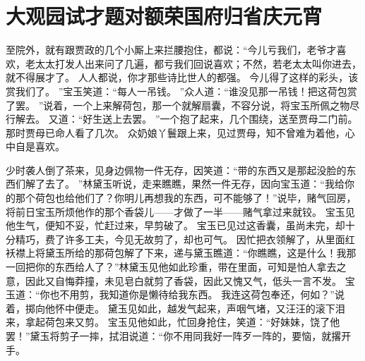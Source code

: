 \chapter{大观园试才题对额\quad 荣国府归省庆元宵}
\par
[话说宝玉来]至院外，就有跟贾政的几个小厮上来拦腰抱住，都说：“今儿亏我们，老爷才喜欢，老太太打发人出来问了几遍，都亏我们回说喜欢；不然，若老太太叫你进去，就不得展才了。
人人都说，你才那些诗比世人的都强。
今儿得了这样的彩头，该赏我们了。
”宝玉笑道：“每人一吊钱。
”众人道：“谁没见那一吊钱！把这荷包赏了罢。
”说着，一个上来解荷包，那一个就解扇囊，不容分说，将宝玉所佩之物尽行解去。
又道：“好生送上去罢。
”一个抱了起来，几个围绕，送至贾母二门前。
那时贾母已命人看了几次。
众奶娘丫鬟跟上来，见过贾母，知不曾难为着他，心中自是喜欢。
\par
少时袭人倒了茶来，见身边佩物一件无存，因笑道：“带的东西又是那起没脸的东西们解了去了。
”林黛玉听说，走来瞧瞧，果然一件无存，因向宝玉道：“我给你的那个荷包也给他们了？你明儿再想我的东西，可不能够了！”说毕，赌气回房，将前日宝玉所烦他作的那个香袋儿——才做了一半——赌气拿过来就铰。
宝玉见他生气，便知不妥，忙赶过来，早剪破了。
宝玉已见过这香囊，虽尚未完，却十分精巧，费了许多工夫，今见无故剪了，却也可气。
因忙把衣领解了，从里面红袄襟上将黛玉所给的那荷包解了下来，递与黛玉瞧道：“你瞧瞧，这是什么！我那一回把你的东西给人了？”林黛玉见他如此珍重，带在里面，可知是怕人拿去之意，因此又自悔莽撞，未见皂白就剪了香袋，因此又愧又气，低头一言不发。
宝玉道：“你也不用剪，我知道你是懒待给我东西。
我连这荷包奉还，何如？”说着，掷向他怀中便走。
黛玉见如此，越发气起来，声咽气堵，又汪汪的滚下泪来，拿起荷包来又剪。
宝玉见他如此，忙回身抢住，笑道：“好妹妹，饶了他罢！”黛玉将剪子一摔，拭泪说道：“你不用同我好一阵歹一阵的，要恼，就撂开手。
